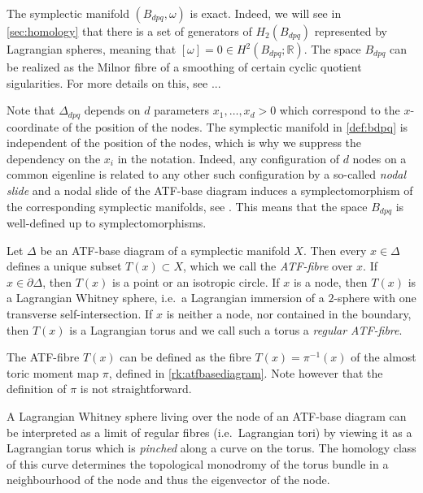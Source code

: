 \documentclass[12pt,a4paper,draft]{scrartcl}
\begin{document}
\begin{remark}
    The symplectic manifold $(B_{dpq}, \omega)$ is exact. Indeed, we will see in \cref{sec:homology} that there is a set of generators of $H_2(B_{dpq})$ represented by Lagrangian spheres, meaning that $[\omega] = 0 \in H^2(B_{dpq};\mathbb{R})$. The space $B_{dpq}$ can be realized as the Milnor fibre of a smoothing of certain cyclic quotient sigularities. For more details on this, see ...
\end{remark}

Note that $\Delta_{dpq}$ depends on $d$ parameters $x_1,\ldots,x_d > 0$ which correspond to the $x$-coordinate of the position of the nodes. The symplectic manifold in \cref{def:bdpq} is independent of the position of the nodes, which is why we suppress the dependency on the $x_i$ in the notation. Indeed, any configuration of $d$ nodes on a common eigenline is related to any other such configuration by a so-called \emph{nodal slide} and a nodal slide of the ATF-base diagram induces a symplectomorphism of the corresponding symplectic manifolds, see \cite[Theorems 8.10]{evans2021atfs}. This means that the space $B_{dpq}$ is well-defined up to symplectomorphisms.

Let $\Delta$ be an ATF-base diagram of a symplectic manifold $X$. Then every $x \in \Delta$ defines a unique subset $T(x) \subset X$, which we call the \emph{ATF-fibre} over $x$. If $x \in \partial \Delta$, then $T(x)$ is a point or an isotropic circle. If $x$ is a node, then $T(x)$ is a Lagrangian Whitney sphere, i.e.\ a Lagrangian immersion of a $2$-sphere with one transverse self-intersection. If $x$ is neither a node, nor contained in the boundary, then $T(x)$ is a Lagrangian torus and we call such a torus a \emph{regular ATF-fibre}.

\begin{remark}
    \label{rk:atffibres}
    The ATF-fibre $T(x)$ can be defined as the fibre $T(x) = \pi^{-1}(x)$ of the almost toric moment map $\pi$, defined in \cref{rk:atfbasediagram}. Note however that the definition of $\pi$ is not straightforward. 
\end{remark}

\begin{remark}
    \label{rk:pinchedtorus}
    A Lagrangian Whitney sphere living over the node of an ATF-base diagram can be interpreted as a limit of regular fibres (i.e.\ Lagrangian tori) by viewing it as a Lagrangian torus which is \emph{pinched} along a curve on the torus. The homology class of this curve determines the topological monodromy of the torus bundle in a neighbourhood of the node and thus the eigenvector of the node. 
\end{remark}
\end{document}
